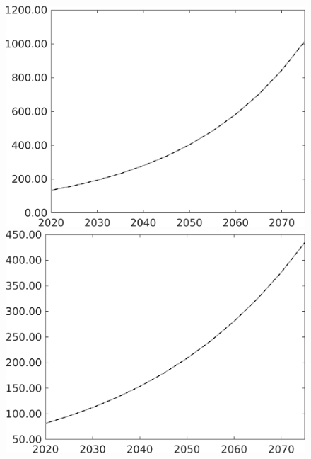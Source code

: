 \documentclass[12pt]{article}
\begin{document}
\begin{figure}[h!!]
\begin{minipage}[]{0.32\textwidth}
	\end{minipage}	
	\begin{minipage}[]{0.32\textwidth}
		\includegraphics[width=1\textwidth]{../../codding_model/own_basedOnFried/optimalPol_010922_revision/figures/all_13Sept22/PerdifNoTauf_regime0_CompTaul_G_spillover0_nsk1_xgr1_knspil1_sep1_LFlimit0_emsbase0_countec0_GovRev0_etaa0.79_lgd0.png}
	\end{minipage}		
	\begin{minipage}[]{0.32\textwidth}
		\includegraphics[width=1\textwidth]{../../codding_model/own_basedOnFried/optimalPol_010922_revision/figures/all_13Sept22/PerdifNoTauf_regime0_CompTaul_pee_spillover0_nsk1_xgr1_knspil1_sep1_LFlimit0_emsbase0_countec0_GovRev0_etaa0.79_lgd0.png}

\end{minipage}
\end{figure}
\end{document}
